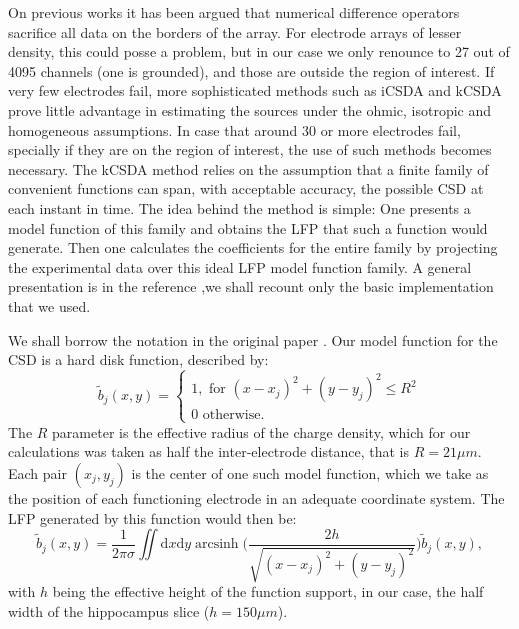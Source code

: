 \documentclass{article}
\DeclareMathOperator{\arcsinh}{arcsinh}
\newcommand{\rd}{\mathrm{d}}
\begin{document}
On previous works it has been argued that numerical difference operators sacrifice all data on the borders of the array. For electrode arrays of lesser density, this could posse a problem, but in our case we only renounce to 27 out of 4095 channels (one is grounded), and those are outside the region of interest.
If very few electrodes fail, more sophisticated methods such as iCSDA \cite{Leski2011} and kCSDA \cite{Potworowski2011} prove little advantage in estimating the sources under the ohmic, isotropic and homogeneous assumptions. In case that around 30 or more electrodes
fail, specially if they are on the region of interest, the use of such methods
becomes necessary. The kCSDA method relies on the
assumption that a finite family of convenient functions can span, with acceptable accuracy, the possible CSD at each instant in time. The idea behind the method is simple:
One presents a model function of this family and obtains the LFP that such a function
would generate. Then one calculates the coefficients for the entire family by projecting the
experimental data over this ideal LFP model function family. A general presentation is in the reference \cite{Potworowski2011},we shall recount only the basic implementation that we used.

We shall borrow the notation in the original paper \cite{Potworowski2011}. Our model function for the CSD is a hard disk function, described by:
\begin{equation}
  \tilde{b}_j(x,y)=\begin{cases}
  1, \text{ for } (x-x_j)^2+(y-y_j)^2 \leq R^2 \\
  0 \text{ otherwise.} 
  \end{cases}
\end{equation}
The $R$ parameter is the effective radius of the charge density, which for our
calculations was taken as half the inter-electrode distance, that is $R=21 \mu m$.
Each pair $(x_j, y_j)$ is the center of one such model function, which we take as
the position of each  functioning electrode in an adequate coordinate system.
The LFP generated by this function would then be:
\begin{equation}
  \tilde{b}_j(x,y)=\frac{1}{2\pi\sigma}
  \iint \! \rd x \rd y \arcsinh \biggr(
  \frac{2 h } {\sqrt{(x-x_j)^2+(y-y_j)^2}}
  \biggl)
  \tilde{b}_j(x,y),
\end{equation}
  with $h$ being the effective height of the function support, in our case,
  the half width of the hippocampus slice ($h=150 \mu m$).
\end{document}

